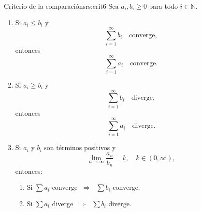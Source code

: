 \begin{teorema}{Criterio de la comparación}{srs:crit6}
    Sea $a_i, b_i \geq 0$ para todo $i \in \mathbb{N}$.
    \begin{enumerate}
        \item Si $a_i \leq b_i$ y 
        \[
            \sum_{i=1}^{\infty} b_i \quad \text{converge},
        \]
        entonces 
        \[
            \sum_{i=1}^{\infty} a_i \quad \text{converge}.
        \]

        \item Si $a_i \geq b_i$ y 
        \[
            \sum_{i=1}^{\infty} b_i \quad \text{diverge},
        \]
        entonces 
        \[
            \sum_{i=1}^{\infty} a_i \quad \text{diverge}.
        \]

        \item Si $a_i$ y $b_i$ son términos positivos y 
        \[
            \lim_{n \to \infty} \frac{a_n}{b_n} = k, \quad k \in (0,\infty),
        \]
        entonces:
        \begin{enumerate}
            \item Si $\sum a_i$ converge $\;\Rightarrow\;$ $\sum b_i$ converge.
            \item Si $\sum a_i$ diverge $\;\Rightarrow\;$ $\sum b_i$ diverge.
        \end{enumerate}
    \end{enumerate}
\end{teorema}

